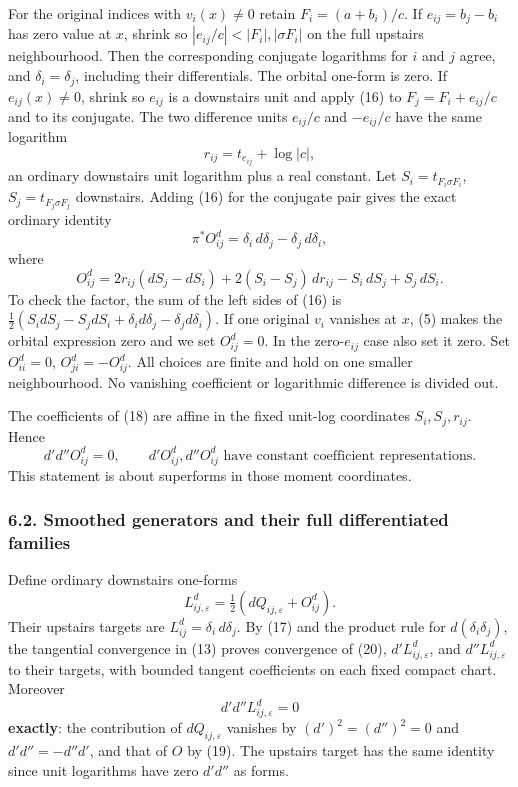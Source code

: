 \documentclass[
  11pt,
]{article}
\begin{document}
For the original indices with \(v_i(x)\ne0\) retain \(F_i=(a+b_i)/c\).
If \(e_{ij}=b_j-b_i\) has zero value at \(x\), shrink so
\(|e_{ij}/c|<|F_i|,|\sigma F_i|\) on the full upstairs neighbourhood.
Then the corresponding conjugate logarithms for \(i\) and \(j\) agree,
and \(\delta_i=\delta_j\), including their differentials. The orbital
one-form is zero. If \(e_{ij}(x)\ne0\), shrink so \(e_{ij}\) is a
downstairs unit and apply (16) to \(F_j=F_i+e_{ij}/c\) and to its
conjugate. The two difference units \(e_{ij}/c\) and \(-e_{ij}/c\) have
the same logarithm \[
 r_{ij}=t_{e_{ij}}+\log|c|,
\] an ordinary downstairs unit logarithm plus a real constant. Let
\(S_i=t_{F_i\sigma F_i}\), \(S_j=t_{F_j\sigma F_j}\) downstairs. Adding
(16) for the conjugate pair gives the exact ordinary identity \[
 \pi^*O_{ij}^{d}=\delta_i\,d\delta_j-\delta_j\,d\delta_i,
                                                                    \tag{17}
\] where \[
 O_{ij}^{d}=2r_{ij}(dS_j-dS_i)+2(S_i-S_j)\,dr_{ij}
                         -S_i\,dS_j+S_j\,dS_i.             \tag{18}
\] To check the factor, the sum of the left sides of (16) is
\(\tfrac12(S_i dS_j-S_j dS_i+
\delta_i d\delta_j-\delta_j d\delta_i)\). If one original \(v_i\)
vanishes at \(x\), (5) makes the orbital expression zero and we set
\(O_{ij}^d=0\). In the zero-\(e_{ij}\) case also set it zero. Set
\(O_{ii}^d=0\), \(O_{ji}^d=-O_{ij}^d\). All choices are finite and hold
on one smaller neighbourhood. No vanishing coefficient or logarithmic
difference is divided out.

The coefficients of (18) are affine in the fixed unit-log coordinates
\(S_i,S_j,r_{ij}\). Hence \[
 d'd''O_{ij}^{d}=0,\qquad d'O_{ij}^{d},d''O_{ij}^{d}
        \text{ have constant coefficient representations}.          \tag{19}
\] This statement is about superforms in those moment coordinates.

\subsubsection{6.2. Smoothed generators and their full differentiated
families}\label{smoothed-generators-and-their-full-differentiated-families}

Define ordinary downstairs one-forms \[
 L_{ij,\varepsilon}^{d}
      =\tfrac12(dQ_{ij,\varepsilon}+O_{ij}^{d}).             \tag{20}
\] Their upstairs targets are \(L_{ij}^{d}=\delta_i\,d\delta_j\). By
(17) and the product rule for \(d(\delta_i\delta_j)\), the tangential
convergence in (13) proves convergence of (20),
\(d'L_{ij,\varepsilon}^{d}\), and \(d''L_{ij,\varepsilon}^{d}\) to their
targets, with bounded tangent coefficients on each fixed compact chart.
Moreover \[
 d'd''L_{ij,\varepsilon}^{d}=0                              \tag{21}
\] \textbf{exactly}: the contribution of \(dQ_{ij,\varepsilon}\)
vanishes by \((d')^2=(d'')^2=0\) and \(d'd''=-d''d'\), and that of \(O\)
by (19). The upstairs target has the same identity since unit logarithms
have zero \(d'd''\) as forms.
\end{document}
